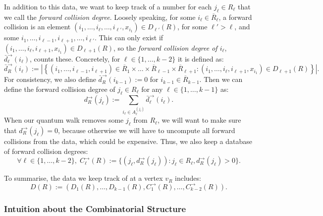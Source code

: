 \documentclass{theoretics}
\renewcommand{\>}{\rangle}
\newcommand{\<}{\langle}
\renewcommand{\(}{\left(}
\renewcommand{\)}{\right)}
\def\abs#1{\left| #1 \right|}
\begin{document}
In addition to this data, we want to keep track of a number for each $j_{\ell}\in R_{\ell}$ that we call the \emph{forward collision degree}. Loosely speaking, for some $i_{\ell}\in \overline{R}_{\ell}$, a forward collision is an element $(i_1,\dots,i_{\ell},\dots,i_{\ell'},x_{i_1})\in D_{\ell'}(R)$, for some $\ell'>\ell$, and some $i_1,\dots,i_{\ell-1},i_{\ell+1},\dots,i_{\ell'}$. This can only exist if $(i_1,\dots,i_{\ell},i_{\ell+1},x_{i_1})\in D_{\ell+1}(R)$, so the \emph{forward collision degree of $i_{\ell}$}, $\bar{d}_{\ell}^{\rightarrow}(i_{\ell})$, counts these. Concretely, for $\ell \in \{1,\dots,k-2\}$ it is defined as:
\begin{equation}
\bar{d}_{R}^{\rightarrow}(i_{\ell}):=\abs{\left\{(i_1,\dots,i_{\ell-1},i_{\ell+1})\in \overline{R}_1\times\dots\times\overline{R}_{\ell-1}\times\overline{R}_{\ell+1} :(i_1,\dots,i_{\ell},i_{\ell+1},x_{i_1})\in D_{\ell+1}(R)\right\}}.\label{eq:k-dist-bar-d}
\end{equation}
For consistency, we also define $\bar{d}_{R}^{\rightarrow}(i_{k-1}):=0$ for $i_{k-1}\in \overline{R}_{k-1}$. 
Then we can define the forward collision degree of $j_{\ell}\in R_{\ell}$ for any $\ell \in \{1,\dots,k-1\}$ as:
\begin{equation}
d_{R}^{\rightarrow}(j_{\ell}):=\sum_{i_{\ell}\in A_{\ell}^{(j_{\ell})}}\bar{d}_{\ell}^{\rightarrow}(i_{\ell}).
\label{eq:forward-collision-degree}
\end{equation}
When our quantum walk removes some $j_{\ell}$ from $R_{\ell}$, we will want to make sure that $d^{\rightarrow}_R(j_{\ell})=0$, because otherwise we will have to uncompute all forward collisions from the data, which could be expensive. Thus, we also keep a database of forward collision degrees:
\begin{equation}
\forall \ell\in\{1,\dots,k-2\},\; C_{\ell}^{\rightarrow}(R) := \{(j_{\ell},d_R^{\rightarrow}(j_{\ell})):j_{\ell}\in R_{\ell},d_{R}^{\rightarrow}(j_{\ell})>0\}.
\label{eq:k-dist-forward-col-db}
\end{equation}

\noindent To summarise, the data we keep track of at a vertex $v_R$ includes:
\begin{equation}
D(R):=(D_1(R),\dots,D_{k-1}(R),C^{\rightarrow}_1(R),\dots,C^{\rightarrow}_{k-2}(R)).
\label{eq:k-dist-data}
\end{equation}


\subsubsection{Intuition about the Combinatorial Structure}
\end{document}

